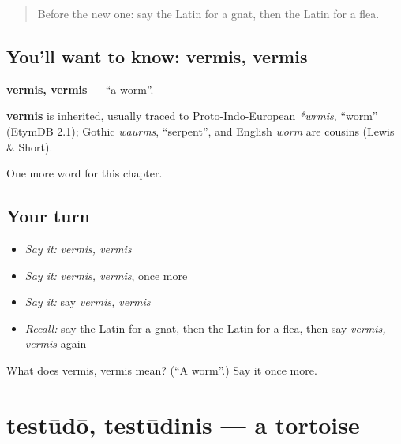 \label{lesson:LA-C276-vermis}



\begin{quote}
Before the new one: say the Latin for a gnat, then the Latin for a flea.
\end{quote}

\subsection*{You'll want to know: vermis, vermis}
\textbf{vermis, vermis} — \textquotedblleft{}a worm\textquotedblright{}.

\begin{cousinweb}
\textbf{vermis} is inherited, usually traced to Proto-Indo-European \emph{*wrmis}, \textquotedblleft{}worm\textquotedblright{} (EtymDB 2.1); Gothic \emph{waurms}, \textquotedblleft{}serpent\textquotedblright{}, and English \emph{worm} are cousins (Lewis \& Short).
\end{cousinweb}

\begin{grammarlens}[title={What you've built}]
One more word for this chapter.
\end{grammarlens}

\subsection*{Your turn}
\begin{itemize}
\raggedright
  \item \emph{Say it:} \emph{vermis, vermis}
  \item \emph{Say it:} \emph{vermis, vermis}, once more
  \item \emph{Say it:} say \emph{vermis, vermis}
  \item \emph{Recall:} say the Latin for a gnat, then the Latin for a flea, then say \emph{vermis, vermis} again
\end{itemize}

\begin{tcolorbox}[breakable,colback=teal!4,colframe=teal!35!black,title={Before you move on}]
What does vermis, vermis mean? (\textquotedblleft{}A worm\textquotedblright{}.) Say it once more.
\end{tcolorbox}
\section[testūdō, testūdinis]{testūdō, testūdinis — a tortoise}

